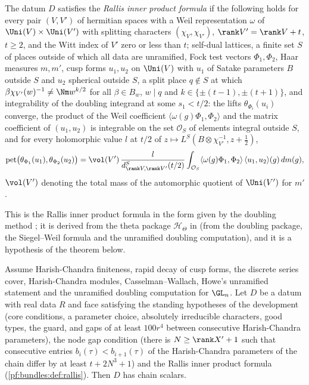 \begin{definition}\label{pf:bundles:def:rallis}
The datum $D$ satisfies the \emph{Rallis inner product formula} if the following holds for every pair $(V,V')$ of hermitian spaces with a
Weil representation $\omega$ of $\Uni(V)\times\Uni(V')$ with splitting characters $(\chi_V,\chi_{V'})$, $\rank V'=\rank V+t$, $t\ge2$, and the Witt
index of $V'$ zero or less than $t$; self-dual lattices, a finite set $S$ of places outside of which all data are unramified, Fock test
vectors $\Phi_1,\Phi_2$, Haar measures $m,m'$, cusp forms $u_1,u_2$ on $\Uni(V)$ with $u_1$ of Satake parameters $B$ outside $S$ and $u_2$
spherical outside $S$, a split place $q\notin S$ at which $\beta\chi_{V'}(w)^{-1}\neq\Nm w^{k/2}$ for all $\beta\in B_w$, $w\mid q$ and
$k\in\{\pm(t-1),\pm(t+1)\}$, and integrability of the doubling integrand at some $s_1<t/2$: the lifts $\theta_{\Phi_i}(u_i)$ converge, the
product of the Weil coefficient $\langle\omega(g)\Phi_1,\Phi_2\rangle$ and the matrix coefficient of $(u_1,u_2)$ is integrable on the set
$\mathcal O_S$ of elements integral outside $S$, and for every holomorphic value $l$ at $t/2$ of $z\mapsto L^S(B\otimes\chi_{V'}^{-1},z+\frac12)$,
\[
\mathrm{pet}\bigl(\theta_{\Phi_1}(u_1),\theta_{\Phi_2}(u_2)\bigr)=\vol(V')\,\frac{l}{d^S_{\rank V,\rank V'}(t/2)}\int_{\mathcal O_S}
\langle\omega(g)\Phi_1,\Phi_2\rangle\,\langle u_1,u_2\rangle(g)\,dm(g),
\]
$\vol(V')$ denoting the total mass of the automorphic quotient of $\Uni(V')$ for $m'$.
\end{definition}

This is the Rallis inner product formula in the form given by the doubling method \cite{Rallis1987,PiatetskiShapiroRallis1987,KudlaRallis1994}; it
is derived from the theta package $\mathcal H_\Theta$ in  (from the doubling
package, the Siegel--Weil formula and the unramified doubling computation), and it is a hypothesis of the theorem below.

\begin{theorem}\label{pf:bundles:thm:chain}
Assume Harish-Chandra finiteness, rapid decay of cusp forms, the discrete series cover, Harish-Chandra modules, Casselman--Wallach, Howe's
unramified statement and the unramified doubling computation for $\GL_n$. Let $D$ be a datum with real data $R$ and face satisfying the
standing hypotheses of the development (core conditions, a parameter choice, absolutely irreducible characters, good types, the guard,
and gaps of at least $100r^4$ between consecutive Harish-Chandra parameters), the node gap condition (there is $N\ge\rank X'+1$ such that
consecutive entries $b_i(\tau)<b_{i+1}(\tau)$ of the Harish-Chandra parameters of the chain differ by at least $t+2N^3+1$) and the Rallis
inner product formula (\cref{pf:bundles:def:rallis}). Then $D$ has chain scalars.
\end{theorem}

